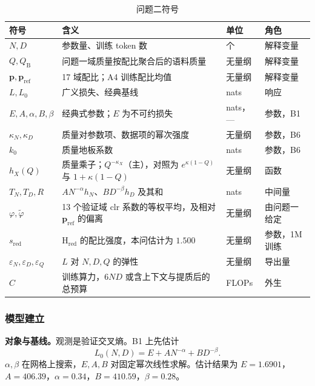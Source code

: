 \begin{table}[htbp]
\centering\small
\caption{问题二符号}
\label{tab:q2sym}
\begin{tabular}{p{2.5cm}p{8.2cm}p{2.2cm}p{2.2cm}}
\toprule
符号 & 含义 & 单位 & 角色 \\
\midrule
$N,D$ & 参数量、训练 token 数 & 个 & 解释变量 \\
$Q,Q_{\mathrm B}$ & 问题一域质量按配比聚合后的语料质量 & 无量纲 & 解释变量 \\
$\mathbf{p},\mathbf{p}_{\mathrm{ref}}$ & 17 域配比；A4 训练配比均值 & 无量纲 & 解释变量 \\
$L,L_0$ & 广义损失、经典基线 & nats & 响应 \\
$E,A,\alpha,B,\beta$ & 经典式参数；$E$ 为不可约损失 & nats，— & 参数，B1 \\
$\kappa_N,\kappa_D$ & 质量对参数项、数据项的幂次强度 & 无量纲 & 参数，B6 \\
$k_0$ & 质量地板系数 & nats & 参数，B6 \\
$h_X(Q)$ & 质量乘子；$Q^{-\kappa_X}$（主），对照为 $e^{\kappa(1-Q)}$ 与 $1+\kappa(1-Q)$ & 无量纲 & 函数 \\
$T_N,T_D,R$ & $AN^{-\alpha}h_N$、$BD^{-\beta}h_D$ 及其和 & nats & 中间量 \\
$\varphi,\tilde\varphi$ & 13 个验证域 clr 系数的等权平均，及相对 $\mathbf{p}_{\mathrm{ref}}$ 的偏离 & 无量纲 & 由问题一给定 \\
$s_{\mathrm{red}}$ & H$_{\mathrm{red}}$ 的配比强度，本问估计为 $1.500$ & 无量纲 & 参数，1M 训练 \\
$\varepsilon_N,\varepsilon_D,\varepsilon_Q$ & $L$ 对 $N,D,Q$ 的弹性 & 无量纲 & 导出量 \\
$C$ & 训练算力，$6ND$ 或含上下文与提质后的总预算 & FLOPs & 外生 \\
\bottomrule
\end{tabular}
\end{table}

\subsubsection{模型建立}

\textbf{对象与基线。}观测是验证交叉熵。B1 上先估计
\begin{equation}
L_0(N,D)=E+AN^{-\alpha}+BD^{-\beta}.
\label{eq:q2l0}
\end{equation}
$\alpha,\beta$ 在网格上搜索，$E,A,B$ 对固定幂次线性求解。估计结果为
$E=1.6901$，$A=406.39$，$\alpha=0.34$，$B=410.59$，$\beta=0.28$。

